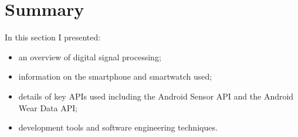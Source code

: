   \section{Summary}
    In this section I presented:
    \begin{itemize}
      \item an overview of digital signal processing;
      \item information on the smartphone and smartwatch used;
      \item details of key APIs used including the Android Sensor API and the Android Wear Data API;
      \item development tools and software engineering techniques.
    \end{itemize}
